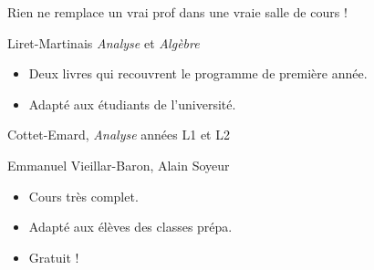 Rien ne remplace un vrai prof dans une vraie salle de cours !



Liret-Martinais \emph{Analyse} et \emph{Algèbre}
\begin{itemize}
  \item Deux livres qui recouvrent le programme de première année.
  \item Adapté aux étudiants de l'université.
\end{itemize}

\bigskip

Cottet-Emard, \emph{Analyse} années L1 et L2

\bigskip

Emmanuel Vieillar-Baron, Alain Soyeur
\begin{itemize}
  \item Cours très complet.
  \item Adapté aux élèves des classes prépa.
  \item Gratuit !
\end{itemize}






